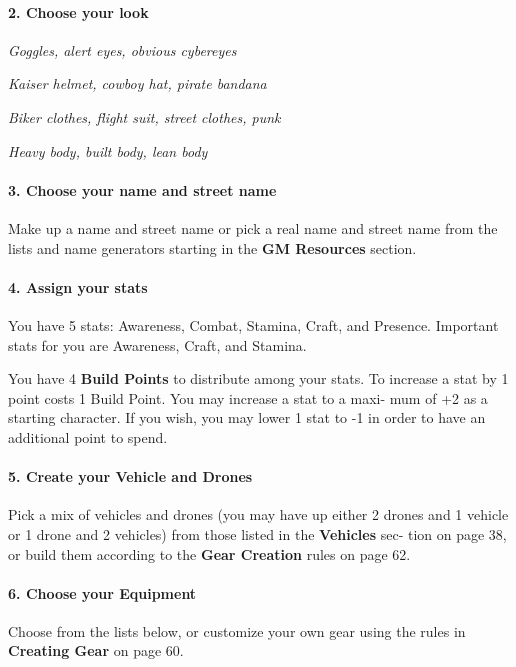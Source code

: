 \begin{multicols}{3}
\paragraph{2.  Choose your look}

\textit{Goggles, alert eyes, obvious cybereyes}

\textit{Kaiser helmet, cowboy hat, pirate bandana}

\textit{Biker clothes, flight suit, street clothes, punk}

\textit{Heavy body, built body, lean body}

\paragraph{3.  Choose your name and street name}

Make up a name and street name or pick a real
name and street name from the lists and name
generators starting in the \textbf{GM Resources} section.

\paragraph{4.  Assign your stats}

You have 5 stats: Awareness, Combat, Stamina,
Craft, and Presence. Important stats for you are
Awareness, Craft, and Stamina.

You have 4 \textbf{Build Points} to distribute among
your stats. To increase a stat by 1 point costs 1
Build Point. You may increase a stat to a maxi-
mum of +2 as a starting character. If you wish,
you may lower 1 stat to -1 in order to have an
additional point to spend.

\paragraph{5.  Create your Vehicle and Drones}

Pick a mix of vehicles and drones (you may have
up either 2 drones and 1 vehicle or 1 drone and
2 vehicles) from those listed in the \textbf{Vehicles} sec-
tion on page 38, or build them according to
the \textbf{Gear Creation} rules on page 62.

\paragraph{6.  Choose your Equipment}

Choose from the lists below, or customize your
own gear using the rules in \textbf{Creating Gear} on
page 60.


\end{multicols}
